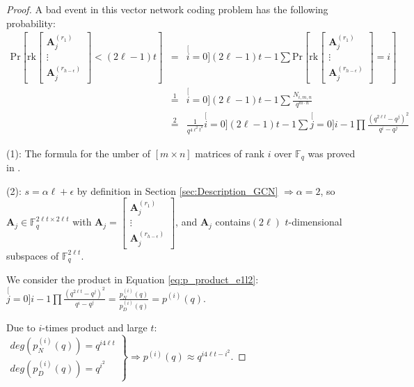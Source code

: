 \begin{proof}
A bad event in this vector network coding problem has the following
probability:
\begin{eqnarray}
\mathrm{Pr}\left[\mathrm{rk}\left[\begin{array}{c}
\boldsymbol{A}_{j}^{\left(r_{1}\right)}\\
\vdots\\
\boldsymbol{A}_{j}^{\left(r_{h-\epsilon}\right)}
\end{array}\right]<\left(2\ell-1\right)t\right] & = & \stackrel[i=0]{\left(2\ell-1\right)t-1}{\mathop{\sum}}\mathrm{Pr}\left[\mathrm{rk}\left[\begin{array}{c}
\boldsymbol{A}_{j}^{\left(r_{1}\right)}\\
\vdots\\
\boldsymbol{A}_{j}^{\left(r_{h-\epsilon}\right)}
\end{array}\right]=i\right]\nonumber \\
 & \overset{1}{=} & \stackrel[i=0]{\left(2\ell-1\right)t-1}{\mathop{\sum}}\frac{N_{i,m,n}}{q^{m\cdot n}}\nonumber \\
 & \overset{2}{=} & \frac{1}{q^{4\ell^{2}t^{2}}}\stackrel[i=0]{\left(2\ell-1\right)t-1}{\mathop{\sum}}\stackrel[j=0]{i-1}{\mathop{\prod}}\frac{\left(q^{2\ell t}-q^{j}\right)^{2}}{q^{i}-q^{j}}\label{eq:p_product_e1l2}
\end{eqnarray}

(1): The formula for the umber of $\left[m\times n\right]$ matrices
of rank $i$ over $\ensuremath{\mathbb{F}}_{q}$ was proved in \cite{Overbeck:2007}.

(2): $s=\alpha\ell+\epsilon$ by definition in Section \ref{sec:Description_GCN}
$\Rightarrow\alpha=2$, so $\boldsymbol{A}_{j}\in\ensuremath{\mathbb{F}}_{q}^{2\ell t\times2\ell t}$
with $\boldsymbol{A}_{j}=\left[\begin{array}{c}
\boldsymbol{A}_{j}^{\left(r_{1}\right)}\\
\vdots\\
\boldsymbol{A}_{j}^{\left(r_{h-\epsilon}\right)}
\end{array}\right]$, and $\boldsymbol{A}_{j}$ contains$\left(2\ell\right)$ $t$-dimensional
subspaces of $\ensuremath{\mathbb{F}}_{q}^{2\ell t}$.

We consider the product in Equation \ref{eq:p_product_e1l2}: $\stackrel[j=0]{i-1}{\mathop{\prod}}\frac{\left(q^{2\ell t}-q^{j}\right)^{2}}{q^{i}-q^{j}}=\frac{p_{N}^{(i)}(q)}{p_{D}^{(i)}(q)}=p^{(i)}(q)$.

Due to $i$-times product and large $t$: $\left.\begin{array}{c}
deg\left(p_{N}^{(i)}(q)\right)=q^{i4\ell t}\\
deg\left(p_{D}^{(i)}(q)\right)=q^{i^{2}}
\end{array}\right\} \Rightarrow p^{(i)}(q)\approx q^{i4\ell t-i^{2}}$.


\end{proof}

